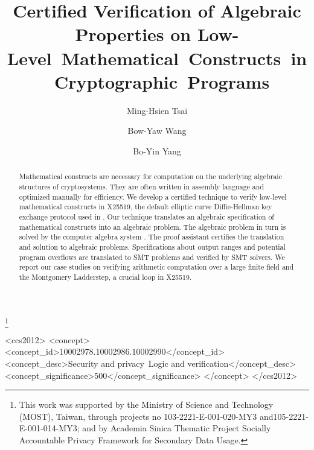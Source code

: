 \documentclass[sigconf]{acmart}
\begin{document}
\title{Certified Verification of Algebraic Properties on
Low- \mbox{Level Mathematical Constructs in Cryptographic Programs}}

\author{Ming-Hsien Tsai}

\author{Bow-Yaw Wang}

\author{Bo-Yin Yang}

\renewcommand{\shortauthors}{M.-H. Tsai et al.}

\thanks{This work was supported by the Ministry of Science and Technology (MOST), Taiwan, through projects no 103-2221-E-001-020-MY3 and105-2221-E-001-014-MY3; and by Academia Sinica Thematic Project Socially Accountable Privacy Framework for Secondary Data Usage.}

\begin{abstract}
  Mathematical constructs are necessary for computation on the
  underlying algebraic structures of cryptosystems. They are often
  written in assembly language and optimized manually for
  efficiency. We develop a certified technique to verify low-level mathematical
  constructs in X25519, the default elliptic curve Diffie-Hellman key
  exchange protocol used in \openssh. Our technique translates an
  algebraic specification of mathematical constructs into an algebraic
  problem. The algebraic
  problem in turn is solved by the computer algebra system \singular.
  The proof assistant
  \coq certifies the translation and solution to algebraic
  problems.
  Specifications about output ranges and potential program overflows are translated to SMT problems and verified by SMT solvers.
  We report our case studies on verifying
  arithmetic computation over a large finite field and
  the Montgomery Ladderstep, a crucial loop in X25519.
\end{abstract}

%
%
\begin{CCSXML}
<ccs2012>
<concept>
<concept_id>10002978.10002986.10002990</concept_id>
<concept_desc>Security and privacy~Logic and verification</concept_desc>
<concept_significance>500</concept_significance>
</concept>
</ccs2012>
\end{CCSXML}
\end{document}
